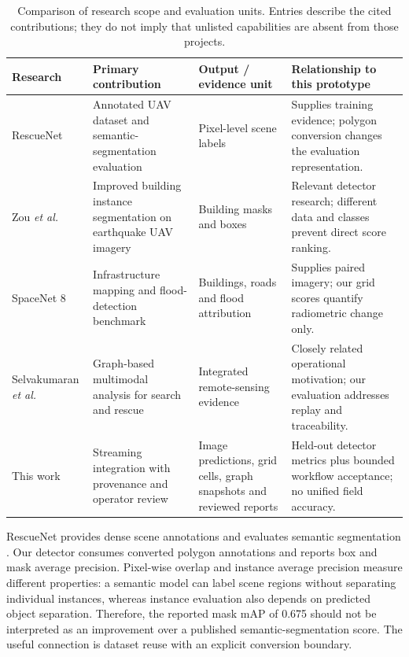 \documentclass[conference]{IEEEtran}
\newcommand{\changed}[1]{{\color{blue}#1}}
\newcommand{\changed}[1]{#1}
\begin{document}
\begin{table}[t]
\caption{\changed{Comparison of research scope and evaluation units. Entries describe the cited contributions; they do not imply that unlisted capabilities are absent from those projects.}}
\label{tab:comparison}
\centering
\footnotesize
\begin{tabular}{@{}p{}p{}p{}p{}@{}}
\toprule
\textbf{Research} & \textbf{Primary contribution} & \textbf{Output / evidence unit} & \textbf{Relationship to this prototype}\\
\midrule
RescueNet \cite{resc} & Annotated UAV dataset and semantic-segmentation evaluation & Pixel-level scene labels & Supplies training evidence; polygon conversion changes the evaluation representation.\\
Zou \emph{et al.} \cite{zou} & Improved building instance segmentation on earthquake UAV imagery & Building masks and boxes & Relevant detector research; different data and classes prevent direct score ranking.\\
SpaceNet 8 \cite{spacenet} & Infrastructure mapping and flood-detection benchmark & Buildings, roads and flood attribution & Supplies paired imagery; our grid scores quantify radiometric change only.\\
Selvakumaran \emph{et al.} \cite{selva} & Graph-based multimodal analysis for search and rescue & Integrated remote-sensing evidence & Closely related operational motivation; our evaluation addresses replay and traceability.\\
This work & Streaming integration with provenance and operator review & Image predictions, grid cells, graph snapshots and reviewed reports & Held-out detector metrics plus bounded workflow acceptance; no unified field accuracy.\\
\bottomrule
\end{tabular}
\end{table}

\changed{RescueNet provides dense scene annotations and evaluates semantic segmentation \cite{resc}. Our detector consumes converted polygon annotations and reports box and mask average precision. Pixel-wise overlap and instance average precision measure different properties: a semantic model can label scene regions without separating individual instances, whereas instance evaluation also depends on predicted object separation. Therefore, the reported mask mAP of 0.675 should not be interpreted as an improvement over a published semantic-segmentation score. The useful connection is dataset reuse with an explicit conversion boundary.}
\end{document}
